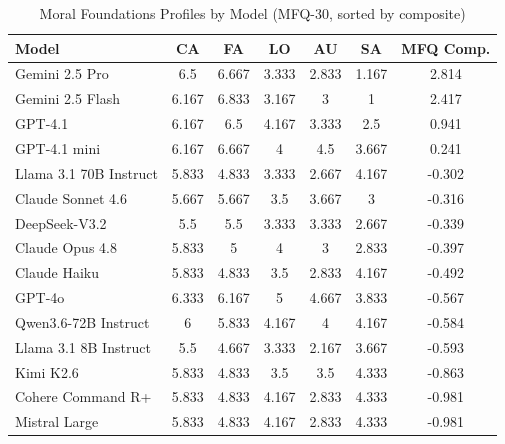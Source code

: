 \begin{table}[ht]
\centering
\caption{Moral Foundations Profiles by Model (MFQ-30, sorted by composite)}
\label{tab:mfq-profiles}
\begin{tabular}{lcccccc}
\toprule
Model & CA & FA & LO & AU & SA & MFQ Comp. \\
\midrule
Gemini 2.5 Pro & 6.5 & 6.667 & 3.333 & 2.833 & 1.167 & 2.814 \\
Gemini 2.5 Flash & 6.167 & 6.833 & 3.167 & 3 & 1 & 2.417 \\
GPT-4.1 & 6.167 & 6.5 & 4.167 & 3.333 & 2.5 & 0.941 \\
GPT-4.1 mini & 6.167 & 6.667 & 4 & 4.5 & 3.667 & 0.241 \\
Llama 3.1 70B Instruct & 5.833 & 4.833 & 3.333 & 2.667 & 4.167 & -0.302 \\
Claude Sonnet 4.6 & 5.667 & 5.667 & 3.5 & 3.667 & 3 & -0.316 \\
DeepSeek-V3.2 & 5.5 & 5.5 & 3.333 & 3.333 & 2.667 & -0.339 \\
Claude Opus 4.8 & 5.833 & 5 & 4 & 3 & 2.833 & -0.397 \\
Claude Haiku & 5.833 & 4.833 & 3.5 & 2.833 & 4.167 & -0.492 \\
GPT-4o & 6.333 & 6.167 & 5 & 4.667 & 3.833 & -0.567 \\
Qwen3.6-72B Instruct & 6 & 5.833 & 4.167 & 4 & 4.167 & -0.584 \\
Llama 3.1 8B Instruct & 5.5 & 4.667 & 3.333 & 2.167 & 3.667 & -0.593 \\
Kimi K2.6 & 5.833 & 4.833 & 3.5 & 3.5 & 4.333 & -0.863 \\
Cohere Command R+ & 5.833 & 4.833 & 4.167 & 2.833 & 4.333 & -0.981 \\
Mistral Large & 5.833 & 4.833 & 4.167 & 2.833 & 4.333 & -0.981 \\
\bottomrule
\end{tabular}
\end{table}
